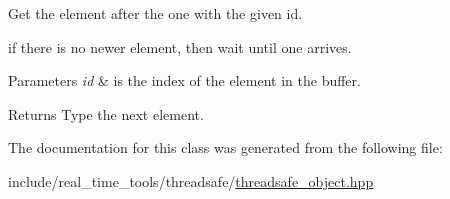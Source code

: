 Get the element after the one with the given id. 

if there is no newer element, then wait until one arrives.


\begin{DoxyParams}{Parameters}
{\em id} & is the index of the element in the buffer. \\
\hline
\end{DoxyParams}
\begin{DoxyReturn}{Returns}
Type the next element. 
\end{DoxyReturn}


The documentation for this class was generated from the following file\+:\begin{DoxyCompactItemize}
\item 
include/real\+\_\+time\+\_\+tools/threadsafe/\hyperlink{threadsafe__object_8hpp}{threadsafe\+\_\+object.\+hpp}\end{DoxyCompactItemize}
